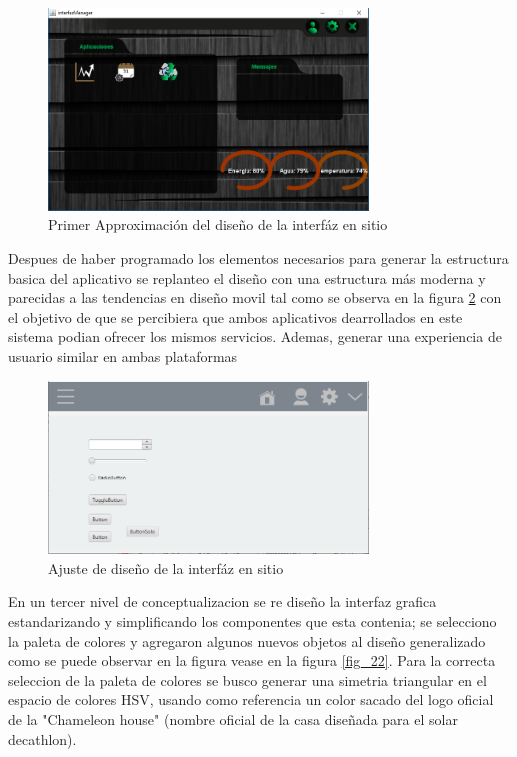 \begin{figure}[htbp]
	\centerline{\includegraphics[width=8.5cm]{./figuras/houseManager23.png}}
	\caption{Primer Approximación del diseño de la interfáz en sitio}
	\label{fig_5}
\end{figure}

Despues de haber programado los elementos necesarios para generar la estructura basica del aplicativo se replanteo el diseño con una estructura más moderna y parecidas a las tendencias en diseño movil tal como se observa en la figura \ref{fig_21} con el objetivo de que se percibiera que ambos aplicativos dearrollados en este sistema podian ofrecer los mismos servicios. Ademas, generar una experiencia de usuario similar en ambas plataformas

\begin{figure}[htbp]
	\centerline{\includegraphics[width=8.5cm]{./figuras/house_manager_version_2.png}}
	\caption{Ajuste de diseño de la interfáz en sitio}
	\label{fig_21}
\end{figure}

En un tercer nivel de conceptualizacion se re diseño la interfaz grafica estandarizando y simplificando los componentes que esta contenia; se selecciono la paleta de colores y agregaron algunos nuevos objetos al diseño generalizado como se puede observar en la figura vease en la figura \ref{fig_22}. Para la correcta seleccion de la paleta de colores se busco generar una simetria triangular en el espacio de colores HSV, usando como referencia un color sacado del logo oficial de la "Chameleon house" (nombre oficial de la casa diseñada para el solar decathlon). 

